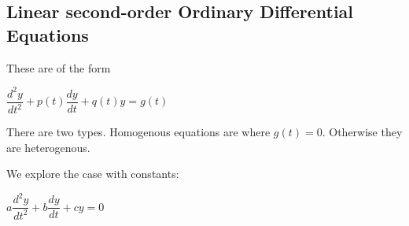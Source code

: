 
\subsection{Linear second-order Ordinary Differential Equations}

These are of the form

\(\dfrac{d^2y}{dt^2}+p(t)\dfrac{dy}{dt}+q(t)y=g(t)\)

There are two types. Homogenous equations are where \(g(t)=0\). Otherwise they are heterogenous.

We explore the case with constants:

\(a\dfrac{d^2y}{dt^2}+b\dfrac{dy}{dt}+cy=0\)


